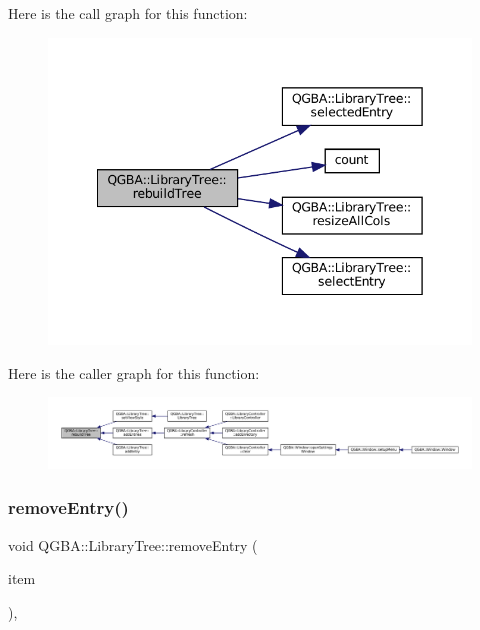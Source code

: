 Here is the call graph for this function\+:
\nopagebreak
\begin{figure}[H]
\begin{center}
\leavevmode
\includegraphics[width=342pt]{class_q_g_b_a_1_1_library_tree_a883554c1ef63b3de33d2f609eb743893_cgraph}
\end{center}
\end{figure}
Here is the caller graph for this function\+:
\nopagebreak
\begin{figure}[H]
\begin{center}
\leavevmode
\includegraphics[width=350pt]{class_q_g_b_a_1_1_library_tree_a883554c1ef63b3de33d2f609eb743893_icgraph}
\end{center}
\end{figure}
\mbox{\label{class_q_g_b_a_1_1_library_tree_a0464c26602fd0ad56c418d888a9b12b9}} 
\subsubsection{\texorpdfstring{remove\+Entry()}{removeEntry()}}
{\footnotesize\ttfamily void Q\+G\+B\+A\+::\+Library\+Tree\+::remove\+Entry (\begin{DoxyParamCaption}\item[{\mbox{\hyperlink{namespace_q_g_b_a_a201fa9f2cb8f778666a134ba81909358}{Library\+Entry\+Ref}}}]{item }\end{DoxyParamCaption})\hspace{0.3cm}{\ttfamily [override]}, {\ttfamily [virtual]}}



